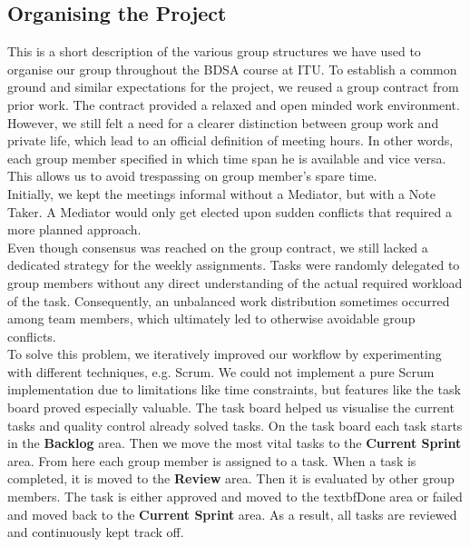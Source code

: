 \subsection{Organising the Project}
This is a short description of the various group structures we have used to organise our group throughout the BDSA course at ITU. To establish a common ground and similar expectations for the project, we reused a group contract from prior work. The contract provided a relaxed and open minded work environment. However, we still felt a need for a clearer distinction between group work and private life, which lead to an official definition of meeting hours. In other words, each group member specified in which time span he is available and vice versa. This allows us to avoid trespassing on group member's spare time. \\  
Initially, we kept the meetings informal without a Mediator,  but with a Note Taker. A Mediator would only get elected upon sudden conflicts that required a more planned approach. 
\\ Even though consensus was reached on the group contract, we still lacked a dedicated strategy for the weekly assignments. Tasks were randomly delegated to group members without any direct understanding of the actual required workload of the task. Consequently, an unbalanced work distribution sometimes occurred among team members, which ultimately led to otherwise avoidable group conflicts. 
\\
To solve this problem, we iteratively improved our workflow by experimenting with  different techniques, e.g. Scrum. We could not implement a pure Scrum implementation due to limitations like time constraints, but features like the task board proved especially valuable. The task board helped us visualise the current tasks and quality control already solved tasks. On the task board each task starts in the \textbf{Backlog} area. Then we move the most vital tasks to the \textbf{Current Sprint} area. From here each group member is assigned to a task. When a task is completed, it is moved to the \textbf{Review} area. Then it is evaluated by other group members. The task is either approved and moved to the textbf{Done} area or failed and moved back to the \textbf{Current Sprint} area. As a result, all tasks are reviewed and continuously kept track off. 


